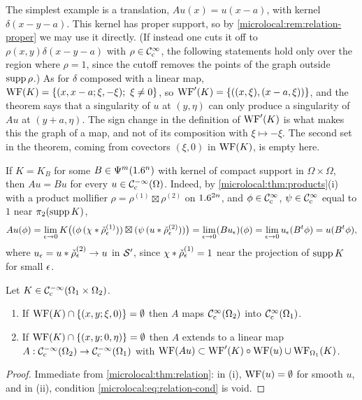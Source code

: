 \begin{discussion}
  The simplest example is a translation, $Au(x)=u(x-a)$, with kernel
  $\delta(x-y-a)$. This kernel has proper support, so by
  \cref{microlocal:rem:relation-proper} we may use it directly. (If instead
  one cuts it off to $\rho(x,y)\delta(x-y-a)$ with $\rho\in\mathcal{C}^\infty_{\mathrm{c}}$, the
  following statements hold only over the region where $\rho=1$, since the
  cutoff removes the points of the graph outside $\operatorname{supp}\rho$.) As for
  $\delta$ composed with a linear map, $\operatorname{WF}(K)=\{(x,x-a;\xi,-\xi);\ \xi\ne0\}$,
  so $\operatorname{WF}'(K)=\{((x,\xi),(x-a,\xi))\}$, and the theorem says that a
  singularity of $u$ at $(y,\eta)$ can only produce a singularity of $Au$ at
  $(y+a,\eta)$. The
  sign change in the definition of $\operatorname{WF}'(K)$ is what makes this the graph of a
  map, and not of its composition with $\xi\mapsto-\xi$. The second set in the
  theorem, coming from covectors $(\xi,0)$ in $\operatorname{WF}(K)$, is empty here.
\end{discussion}

\begin{remark}\label{microlocal:rem:relation-psido}
  If $K=K_B$ for some $B\in\Psi^{m}(1.6^n)$ with kernel of compact support in
  $\Omega\times\Omega$, then $Au=Bu$ for every $u\in\mathcal{C}^{-\infty}_{\mathrm{c}}(\Omega)$. Indeed, by
  \cref{microlocal:thm:products}(i) with a product mollifier
  $\rho=\rho^{(1)}\boxtimes\rho^{(2)}$ on $1.6^{2n}$, and
  $\phi\in\mathcal{C}^\infty_{\mathrm{c}}$, $\psi\in\mathcal{C}^\infty_{\mathrm{c}}$ equal to $1$ near $\pi_2(\operatorname{supp} K)$,
  \begin{equation*}
    Au(\phi)=\lim_{\epsilon\to0}K\bigl((\phi\,(\chi*\check\rho^{(1)}_\epsilon))\boxtimes
    (\psi\,(u*\check\rho^{(2)}_\epsilon))\bigr)
    =\lim_{\epsilon\to0}(Bu_\epsilon)(\phi)=\lim_{\epsilon\to0}u_\epsilon(B^t\phi)=u(B^t\phi),
  \end{equation*}
  where $u_\epsilon=u*\check\rho^{(2)}_\epsilon\to u$ in $\mathcal{S}'$, since
  $\chi*\check\rho^{(1)}_\epsilon=1$ near the projection of $\operatorname{supp} K$ for small $\epsilon$.
\end{remark}

\begin{corollary}\label{microlocal:cor:relation}
  Let $K\in\mathcal{C}^{-\infty}_{\mathrm{c}}(\Omega_1\times\Omega_2)$.
  \begin{enumerate}[label=\textup{(\roman*)}]
  \item If $\operatorname{WF}(K)\cap\{(x,y;\xi,0)\}=\emptyset$ then $A$ maps $\mathcal{C}^\infty_{\mathrm{c}}(\Omega_2)$
    into $\mathcal{C}^\infty_{\mathrm{c}}(\Omega_1)$.
  \item If $\operatorname{WF}(K)\cap\{(x,y;0,\eta)\}=\emptyset$ then $A$ extends to a linear
    map $A:\mathcal{C}^{-\infty}_{\mathrm{c}}(\Omega_2)\to\mathcal{C}^{-\infty}_{\mathrm{c}}(\Omega_1)$ with
    $\operatorname{WF}(Au)\subset\operatorname{WF}'(K)\circ\operatorname{WF}(u)\cup\operatorname{WF}_{\Omega_1}(K)$.
  \end{enumerate}
\end{corollary}
\begin{proof}
  Immediate from \cref{microlocal:thm:relation}: in (i), $\operatorname{WF}(u)=\emptyset$ for
  smooth $u$, and in (ii), condition \eqref{microlocal:eq:relation-cond} is
  void.
\end{proof}

